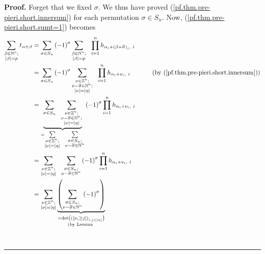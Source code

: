 \documentclass
[numbers=enddot,12pt,final,onecolumn,notitlepage,english]{scrartcl}%
\theoremstyle{definition}
\newenvironment{proof}[1][Proof]{\noindent\textbf{#1.} }{\ \rule{0.5em}{0.5em}}
\let\sumnonlimits\sum
\let\prodnonlimits\prod
\renewcommand{\sum}{\sumnonlimits\limits}
\renewcommand{\prod}{\prodnonlimits\limits}
\newenvironment{vershort}{}{}
\begin{document}
\begin{vershort}
\begin{proof}
Forget that we fixed $\sigma$. We thus have proved
(\ref{pf.thm.pre-pieri.short.innersum}) for each permutation $\sigma\in S_{n}%
$. Now, (\ref{pf.thm.pre-pieri.short.sumt=1}) becomes%
\begin{align}
\sum_{\substack{\beta\in\mathbb{N}^{n};\\\left\vert \beta\right\vert
=p}}t_{\alpha+\beta}  &  =\sum_{\sigma\in S_{n}}\left(  -1\right)  ^{\sigma
}\sum_{\substack{\beta\in\mathbb{N}^{n};\\\left\vert \beta\right\vert
=p}}\ \ \prod_{i=1}^{n}h_{\alpha_{i}+\left(  \beta+\overline{\sigma}\right)
_{i},\ i}\nonumber\\
&  =\sum_{\sigma\in S_{n}}\left(  -1\right)  ^{\sigma}\sum_{\substack{\nu
\in\mathbb{Z}^{n};\\\nu-\overline{\sigma}\in\mathbb{N}^{n};\\\left\vert
\nu\right\vert =\left\vert \eta\right\vert }}\ \ \prod_{i=1}^{n}h_{\alpha
_{i}+\nu_{i},\ i}\ \ \ \ \ \ \ \ \ \ \left(  \text{by
(\ref{pf.thm.pre-pieri.short.innersum})}\right) \nonumber\\
&  =\underbrace{\sum_{\sigma\in S_{n}}\ \ \sum_{\substack{\nu\in\mathbb{Z}%
^{n};\\\nu-\overline{\sigma}\in\mathbb{N}^{n};\\\left\vert \nu\right\vert
=\left\vert \eta\right\vert }}}_{=\sum_{\substack{\nu\in\mathbb{Z}%
^{n};\\\left\vert \nu\right\vert =\left\vert \eta\right\vert }}\ \ \sum
_{\substack{\sigma\in S_{n};\\\nu-\overline{\sigma}\in\mathbb{N}^{n}}}}\left(
-1\right)  ^{\sigma}\prod_{i=1}^{n}h_{\alpha_{i}+\nu_{i},\ i}\nonumber\\
&  =\sum_{\substack{\nu\in\mathbb{Z}^{n};\\\left\vert \nu\right\vert
=\left\vert \eta\right\vert }}\ \ \sum_{\substack{\sigma\in S_{n}%
;\\\nu-\overline{\sigma}\in\mathbb{N}^{n}}}\left(  -1\right)  ^{\sigma}%
\prod_{i=1}^{n}h_{\alpha_{i}+\nu_{i},\ i}\nonumber\\
&  =\sum_{\substack{\nu\in\mathbb{Z}^{n};\\\left\vert \nu\right\vert
=\left\vert \eta\right\vert }}\underbrace{\left(  \sum_{\substack{\sigma\in
S_{n};\\\nu-\overline{\sigma}\in\mathbb{N}^{n}}}\left(  -1\right)  ^{\sigma
}\right)  }_{\substack{=\det\left(  \left(  \left[  \nu_{i}\geq j\right]
\right)  _{i,j\in\left[  n\right]  }\right)  \\\text{(by Lemma
}}}
\end{align}
\end{proof}
\end{vershort}
\end{document}
